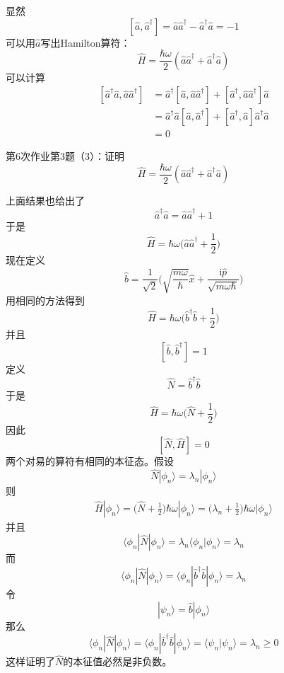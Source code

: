         显然
        \[ [\hat{a},\hat{a}^\dagger] = \hat{a}\hat{a}^\dagger - \hat{a}^\dagger \hat{a} =  -1 \]
        可以用$\hat{a}$写出Hamilton算符：
        \[ \hat{H} = \frac {\hbar \omega}2 (\hat{a}\hat{a}^\dagger + \hat{a}^\dagger \hat{a}) \]
        可以计算
        \begin{equation}\begin{aligned}
            [\hat{a}^\dagger\hat{a}, \hat{a}\hat{a}^\dagger] &= \hat{a}^\dagger [\hat{a},\hat{a}\hat{a}^\dagger] +  [\hat{a}^\dagger,\hat{a}\hat{a}^\dagger]\hat{a}\\
            &= \hat{a}^\dagger\hat{a}[\hat{a},\hat{a}^\dagger] + [\hat{a}^\dagger,\hat{a}]\hat{a}^\dagger \hat{a}\\
            &= 0
        \end{aligned}\end{equation}
        \begin{asg}
            第6次作业第3题（3）：证明
            \[ \hat{H} = \frac {\hbar \omega}2 (\hat{a}\hat{a}^\dagger + \hat{a}^\dagger \hat{a}) \]
        \end{asg}
        上面结果也给出了
        \[ \hat{a}^\dagger\hat{a} = \hat{a}\hat{a}^\dagger + 1 \]
        于是
        \[ \hat{H} = \hbar \omega\bigg(\hat{a}\hat{a}^\dagger + \frac 12\bigg)\]
        现在定义
        \[ \hat{b} = \frac 1{\sqrt{2}}\bigg(\sqrt{\frac {m\omega}{\hbar}}\hat{x} + \frac {\mathrm{i}\hat{p}}{\sqrt{m\omega\hbar}}\bigg) \]
        用相同的方法得到 
        \[ \hat{H} = \hbar \omega\bigg(\hat{b}^\dagger\hat{b}+ \frac 12\bigg) \]
        并且
        \[ [\hat{b}, \hat{b}^\dagger] = 1 \]
        定义
        \[ \hat{N} = \hat{b}^\dagger\hat{b} \]
        于是
        \[ \hat{H} = \hbar \omega \bigg(\hat{N}+\frac 12\bigg) \]
        因此 
        \[ [\hat{N},\hat{H}] = 0 \]
        两个对易的算符有相同的本征态。假设
        \[ \hat{N}|\phi_n \rangle = \lambda_n |\phi_n \rangle \]
        则
        \begin{equation}\begin{aligned}
            \hat{H}|\phi_n \rangle = \bigg(\hat{N}+\frac 12\bigg)\hbar\omega|\phi_n \rangle = \bigg(\lambda_n + \frac 12\bigg)\hbar\omega|\phi_n\rangle
        \end{aligned}\end{equation}
        并且
        \[ \langle \phi_n|\hat{N}|\phi_n \rangle = \lambda_n \langle \phi_n |\phi_n \rangle = \lambda_n \]
        而
        \[ \langle \phi_n|\hat{N}|\phi_n \rangle =  \langle \phi_n |\hat{b}^\dagger\hat{b}|\phi_n \rangle = \lambda_n \]
        令
        \[ |\psi_n \rangle = \hat{b}|\phi_n\rangle \]
        那么
        \[ \langle \phi_n|\hat{N}|\phi_n \rangle =  \langle \phi_n |\hat{b}^\dagger\hat{b}|\phi_n \rangle = \langle \psi_n|\psi_n \rangle = \lambda_n \geqslant 0 \]
        这样证明了$\hat{N}$的本征值必然是非负数。

